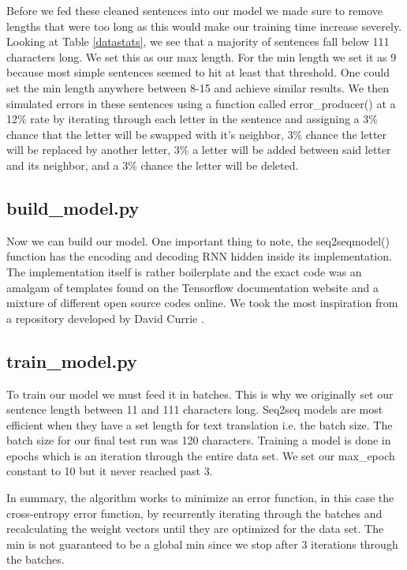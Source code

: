 \documentclass[11pt,a4paper]{scrartcl}
\theoremstyle{definition}
\begin{document}
Before we fed these cleaned sentences into our model we made sure to remove lengths that were too long as this would make our training time increase severely. Looking at Table \ref{datastats}, we see that a majority of sentences fall below 111 characters long. We set this as our max length. For the min length we set it as 9 because most simple sentences seemed to hit at least that threshold. One could set the min length anywhere between 8-15 and achieve similar results. We then simulated errors in these sentences using a function called error\_producer() at a 12\% rate by iterating through each letter in the sentence and assigning a 3\% chance that the letter will be swapped with it’s neighbor, 3\% chance the letter will be replaced by another letter, 3\% a letter will be added between said letter and its neighbor, and a 3\% chance the letter will be deleted.

\subsection{build\_model.py}
Now we can build our model. One important thing to note, the seq2seqmodel() function has the encoding and decoding RNN hidden inside its implementation. The implementation itself is rather boilerplate and the exact code was an amalgam of templates found on the Tensorflow documentation website and a mixture of different open source codes online. We took the most inspiration from a repository developed by David Currie \cite{Currie}. 

\vspace{1em}
\subsection{train\_model.py}
To train our model we must feed it in batches. This is why we originally set our sentence length between 11 and 111 characters long. Seq2seq models are most efficient when they have a set length for text translation i.e. the batch size. The batch size for our final test run was 120 characters. Training a model is done in epochs which is an iteration through the entire data set. We set our max\_epoch constant to 10 but it never reached past 3.\newline


\vspace{1em}
In summary, the algorithm works to minimize an error function, in this case the cross-entropy error function, by recurrently iterating through the batches and recalculating the weight vectors until they are optimized for the data set. The min is not guaranteed to be a global min since we stop after 3 iterations through the batches.
\end{document}

